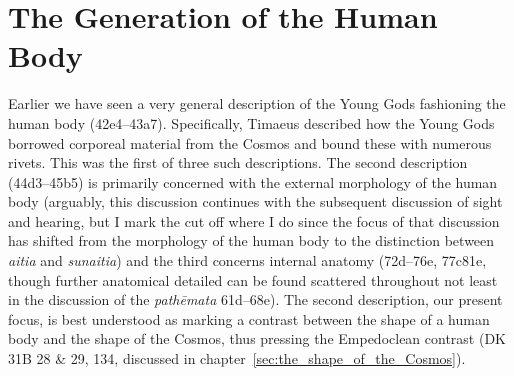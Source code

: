 
\section{The Generation of the Human Body} %
\label{sec:structuring_the_human_body}

Earlier we have seen a very general description of the Young Gods fashioning the human body (42e4--43a7). Specifically, Timaeus described how the Young Gods borrowed corporeal material from the Cosmos and bound these with numerous rivets. This was the first of three such descriptions. The second description (44d3--45b5) is primarily concerned with the external morphology of the human body (arguably, this discussion continues with the subsequent discussion of sight and hearing, but I mark the cut off where I do since the focus of that discussion has shifted from the morphology of the human body to the distinction between \emph{aitia} and \emph{sunaitia}) and the third concerns internal anatomy (72d--76e, 77c81e, though further anatomical detailed can be found scattered throughout not least in the discussion of the \emph{pathēmata} 61d--68e). The second description, our present focus, is best understood as marking a contrast between the shape of a human body and the shape of the Cosmos, thus pressing the Empedoclean contrast (DK 31B 28 \& 29, 134, discussed in chapter~\ref{sec:the_shape_of_the_Cosmos}).



